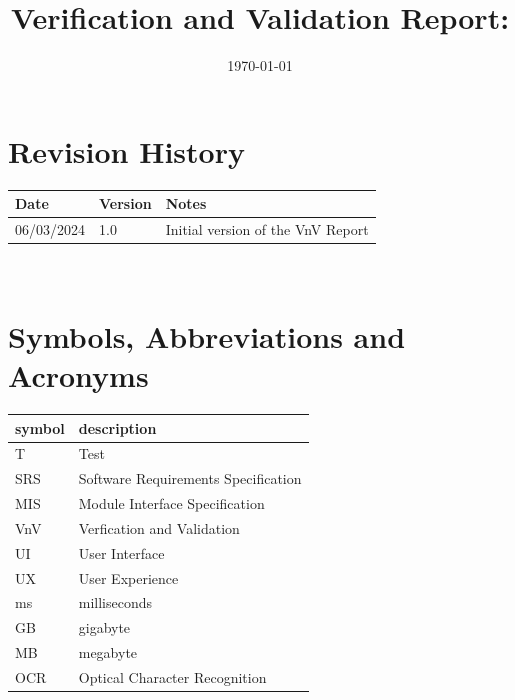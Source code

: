 \documentclass[12pt, titlepage]{article}
\begin{document}
\title{Verification and Validation Report: \progname} 
\author{\authname}
\date{\today}

\maketitle


\section{Revision History}

\begin{tabularx}{\textwidth}{p{3cm}p{2cm}X}
\toprule {\bf Date} & {\bf Version} & {\bf Notes}\\
\midrule
06/03/2024 & 1.0 & Initial version of the VnV Report\\
\bottomrule
\end{tabularx}

~\newpage

\section{Symbols, Abbreviations and Acronyms}

\renewcommand{\arraystretch}{1.2}
\begin{tabular}{l l} 
  \toprule    
  \textbf{symbol} & \textbf{description}\\
  \midrule 
  T & Test\\
  SRS & Software Requirements Specification\\
  MIS & Module Interface Specification\\
  VnV & Verfication and Validation\\
  UI & User Interface\\
  UX & User Experience\\
  ms & milliseconds\\
  GB & gigabyte\\
  MB & megabyte\\
  OCR & Optical Character Recognition\\
  \bottomrule
\end{tabular}\\

\newpage

\tableofcontents

\listoftables %

\listoffigures %
\end{document}
